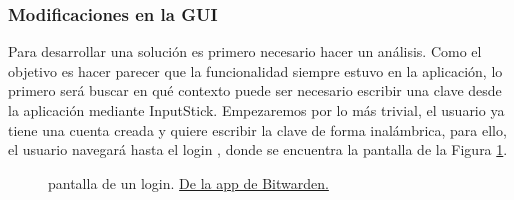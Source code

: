 \subsubsection{Modificaciones en la GUI}

Para desarrollar una solución es primero necesario hacer un análisis. Como el objetivo es hacer parecer que la funcionalidad siempre estuvo en la aplicación, lo primero será buscar en qué contexto puede ser necesario escribir una clave desde la aplicación mediante InputStick. Empezaremos por lo más trivial, el usuario ya tiene una \gls{cuenta} creada y quiere escribir la clave de forma inalámbrica, para ello, el usuario navegará hasta el \gls{login} \cite{item}, donde se encuentra la pantalla de la Figura \ref{fig:bitapp-login-view}.

\begin{figure}[H]
    \centering
    \caption{pantalla de un \gls{login}. \href{https://play.google.com/store/apps/details?id=com.x8bit.bitwarden}{De la app de Bitwarden.}}
    \label{fig:bitapp-login-view}
\end{figure}


